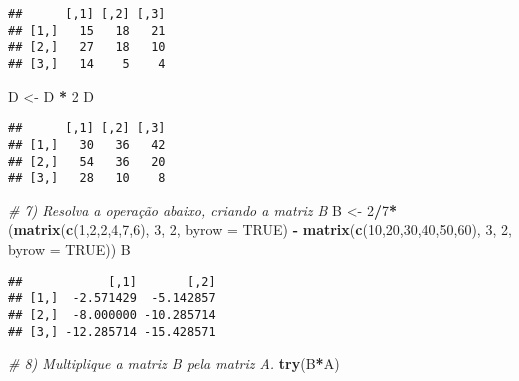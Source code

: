 \documentclass[]{article}
\newenvironment{Shaded}{\begin{snugshade}}{\end{snugshade}}
\newcommand{\CommentTok}[1]{\textcolor[rgb]{0.56,0.35,0.01}{\textit{#1}}}
\newcommand{\DataTypeTok}[1]{\textcolor[rgb]{0.13,0.29,0.53}{#1}}
\newcommand{\DecValTok}[1]{\textcolor[rgb]{0.00,0.00,0.81}{#1}}
\newcommand{\KeywordTok}[1]{\textcolor[rgb]{0.13,0.29,0.53}{\textbf{#1}}}
\newcommand{\NormalTok}[1]{#1}
\newcommand{\OperatorTok}[1]{\textcolor[rgb]{0.81,0.36,0.00}{\textbf{#1}}}
\newcommand{\OtherTok}[1]{\textcolor[rgb]{0.56,0.35,0.01}{#1}}
\newcommand{\StringTok}[1]{\textcolor[rgb]{0.31,0.60,0.02}{#1}}
\begin{document}
\begin{verbatim}
##      [,1] [,2] [,3]
## [1,]   15   18   21
## [2,]   27   18   10
## [3,]   14    5    4
\end{verbatim}

\begin{Shaded}
\begin{Highlighting}[]
\NormalTok{D <-}\StringTok{ }\NormalTok{D }\OperatorTok{*}\StringTok{ }\DecValTok{2}
\NormalTok{D}
\end{Highlighting}
\end{Shaded}

\begin{verbatim}
##      [,1] [,2] [,3]
## [1,]   30   36   42
## [2,]   54   36   20
## [3,]   28   10    8
\end{verbatim}

\begin{Shaded}
\begin{Highlighting}[]
\CommentTok{# 7) Resolva a operação abaixo, criando a matriz B}
\NormalTok{B <-}\StringTok{ }\DecValTok{2}\OperatorTok{/}\DecValTok{7}\OperatorTok{*}\NormalTok{(}\KeywordTok{matrix}\NormalTok{(}\KeywordTok{c}\NormalTok{(}\DecValTok{1}\NormalTok{,}\DecValTok{2}\NormalTok{,}\DecValTok{2}\NormalTok{,}\DecValTok{4}\NormalTok{,}\DecValTok{7}\NormalTok{,}\DecValTok{6}\NormalTok{), }\DecValTok{3}\NormalTok{, }\DecValTok{2}\NormalTok{, }\DataTypeTok{byrow =} \OtherTok{TRUE}\NormalTok{) }\OperatorTok{-}\StringTok{ }\KeywordTok{matrix}\NormalTok{(}\KeywordTok{c}\NormalTok{(}\DecValTok{10}\NormalTok{,}\DecValTok{20}\NormalTok{,}\DecValTok{30}\NormalTok{,}\DecValTok{40}\NormalTok{,}\DecValTok{50}\NormalTok{,}\DecValTok{60}\NormalTok{), }\DecValTok{3}\NormalTok{, }\DecValTok{2}\NormalTok{, }\DataTypeTok{byrow =} \OtherTok{TRUE}\NormalTok{))}
\NormalTok{B}
\end{Highlighting}
\end{Shaded}

\begin{verbatim}
##            [,1]       [,2]
## [1,]  -2.571429  -5.142857
## [2,]  -8.000000 -10.285714
## [3,] -12.285714 -15.428571
\end{verbatim}

\begin{Shaded}
\begin{Highlighting}[]
\CommentTok{# 8) Multiplique a matriz B pela matriz A.}
\KeywordTok{try}\NormalTok{(B}\OperatorTok{*}\NormalTok{A)}
\end{Highlighting}
\end{Shaded}
\end{document}
